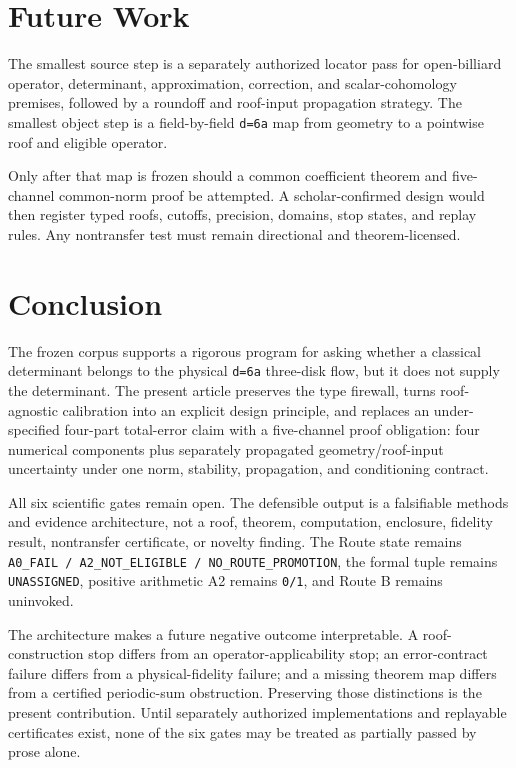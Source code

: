 \documentclass[11pt,a4paper]{article}
\begin{document}
\section{Future Work}

The smallest source step is a separately authorized locator pass for open-billiard operator, determinant, approximation, correction, and scalar-cohomology premises, followed by a roundoff and roof-input propagation strategy. The smallest object step is a field-by-field \texttt{d=6a} map from geometry to a pointwise roof and eligible operator.

Only after that map is frozen should a common coefficient theorem and five-channel common-norm proof be attempted. A scholar-confirmed design would then register typed roofs, cutoffs, precision, domains, stop states, and replay rules. Any nontransfer test must remain directional and theorem-licensed.

\section{Conclusion}

The frozen corpus supports a rigorous program for asking whether a classical determinant belongs to the physical \texttt{d=6a} three-disk flow, but it does not supply the determinant. The present article preserves the type firewall, turns roof-agnostic calibration into an explicit design principle, and replaces an under-specified four-part total-error claim with a five-channel proof obligation: four numerical components plus separately propagated geometry/roof-input uncertainty under one norm, stability, propagation, and conditioning contract.

All six scientific gates remain open. The defensible output is a falsifiable methods and evidence architecture, not a roof, theorem, computation, enclosure, fidelity result, nontransfer certificate, or novelty finding. The Route state remains \texttt{A0\_FAIL\ /\ A2\_NOT\_ELIGIBLE\ /\ NO\_ROUTE\_PROMOTION}, the formal tuple remains \texttt{UNASSIGNED}, positive arithmetic A2 remains \texttt{0/1}, and Route B remains uninvoked.

The architecture makes a future negative outcome interpretable. A roof-construction stop differs from an operator-applicability stop; an error-contract failure differs from a physical-fidelity failure; and a missing theorem map differs from a certified periodic-sum obstruction. Preserving those distinctions is the present contribution. Until separately authorized implementations and replayable certificates exist, none of the six gates may be treated as partially passed by prose alone.
\end{document}
